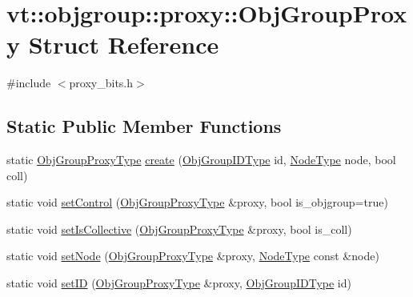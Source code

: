 \hypertarget{structvt_1_1objgroup_1_1proxy_1_1_obj_group_proxy}{}\section{vt\+:\+:objgroup\+:\+:proxy\+:\+:Obj\+Group\+Proxy Struct Reference}
\label{structvt_1_1objgroup_1_1proxy_1_1_obj_group_proxy}


{\ttfamily \#include $<$proxy\+\_\+bits.\+h$>$}

\subsection*{Static Public Member Functions}
\begin{DoxyCompactItemize}
\item 
static \hyperlink{namespacevt_ad7cae989df485fccca57f0792a880a8e}{Obj\+Group\+Proxy\+Type} \hyperlink{structvt_1_1objgroup_1_1proxy_1_1_obj_group_proxy_aacefa6e5a6ce4fd8581e21f945c52961}{create} (\hyperlink{namespacevt_1_1objgroup_a54a50ff6833bf618e5bedb9a3b6d0e07}{Obj\+Group\+I\+D\+Type} id, \hyperlink{namespacevt_a866da9d0efc19c0a1ce79e9e492f47e2}{Node\+Type} node, bool coll)
\item 
static void \hyperlink{structvt_1_1objgroup_1_1proxy_1_1_obj_group_proxy_ad80d3bcbde0bad7a7dc0c9082c584e18}{set\+Control} (\hyperlink{namespacevt_ad7cae989df485fccca57f0792a880a8e}{Obj\+Group\+Proxy\+Type} \&proxy, bool is\+\_\+objgroup=true)
\item 
static void \hyperlink{structvt_1_1objgroup_1_1proxy_1_1_obj_group_proxy_a5a4ff4e167d511dd0265bc4370d2389c}{set\+Is\+Collective} (\hyperlink{namespacevt_ad7cae989df485fccca57f0792a880a8e}{Obj\+Group\+Proxy\+Type} \&proxy, bool is\+\_\+coll)
\item 
static void \hyperlink{structvt_1_1objgroup_1_1proxy_1_1_obj_group_proxy_a8df9357e3939df4abbd816b94b3fef32}{set\+Node} (\hyperlink{namespacevt_ad7cae989df485fccca57f0792a880a8e}{Obj\+Group\+Proxy\+Type} \&proxy, \hyperlink{namespacevt_a866da9d0efc19c0a1ce79e9e492f47e2}{Node\+Type} const \&node)
\item 
static void \hyperlink{structvt_1_1objgroup_1_1proxy_1_1_obj_group_proxy_aa05508d3db9a5d82267f5b3b60baa7a2}{set\+ID} (\hyperlink{namespacevt_ad7cae989df485fccca57f0792a880a8e}{Obj\+Group\+Proxy\+Type} \&proxy, \hyperlink{namespacevt_1_1objgroup_a54a50ff6833bf618e5bedb9a3b6d0e07}{Obj\+Group\+I\+D\+Type} id)
\item 

\end{DoxyCompactItemize}

